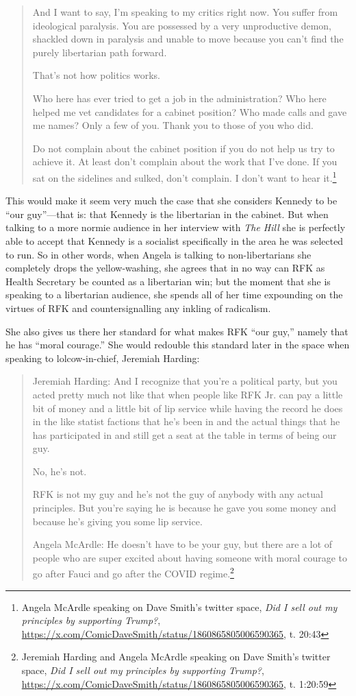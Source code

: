 \documentclass[11pt]{article}
\begin{document}
\begin{quote}
And I want to say, I'm speaking to my critics right now. You suffer from ideological paralysis. You are possessed by a very unproductive demon, shackled down in paralysis and unable to move because you can't find the purely libertarian path forward.

That's not how politics works.

Who here has ever tried to get a job in the administration? Who here helped me vet candidates for a cabinet position? Who made calls and gave me names? Only a few of you. Thank you to those of you who did.

Do not complain about the cabinet position if you do not help us try to achieve it. At least don't complain about the work that I've done. If you sat on the sidelines and sulked, don't complain. I don't want to hear it.\footnote{Angela McArdle speaking on Dave Smith's twitter space, \emph{Did I sell out my principles by supporting Trump?}, \url{https://x.com/ComicDaveSmith/status/1860865805006590365}, t. 20:43}
\end{quote}

This would make it seem very much the case that she considers Kennedy to be ``our guy''---that is: that Kennedy is the libertarian in the cabinet. But when talking to a more normie audience in her interview with \emph{The Hill} she is perfectly able to accept that Kennedy is a socialist specifically in the area he was selected to run. So in other words, when Angela is talking to non-libertarians she completely drops the yellow-washing, she agrees that in no way can RFK as Health Secretary be counted as a libertarian win; but the moment that she is speaking to a libertarian audience, she spends all of her time expounding on the virtues of RFK and countersignalling any inkling of radicalism.

She also gives us there her standard for what makes RFK ``our guy,'' namely that he has ``moral courage.'' She would redouble this standard later in the space when speaking to lolcow-in-chief, Jeremiah Harding:
\begin{quote}
Jeremiah Harding: And I recognize that you're a political party, but you acted pretty much not like that when people like RFK Jr. can pay a little bit of money and a little bit of lip service while having the record he does in the like statist factions that he's been in and the actual things that he has participated in and still get a seat at the table in terms of being our guy.

No, he's not.

RFK is not my guy and he's not the guy of anybody with any actual principles. But you're saying he is because he gave you some money and because he's giving you some lip service.

Angela McArdle: He doesn't have to be your guy, but there are a lot of people who are super excited about having someone with moral courage to go after Fauci and go after the COVID regime.\footnote{Jeremiah Harding and Angela McArdle speaking on Dave Smith's twitter space, \emph{Did I sell out my principles by supporting Trump?}, \url{https://x.com/ComicDaveSmith/status/1860865805006590365}, t. 1:20:59}
\end{quote}
\end{document}
